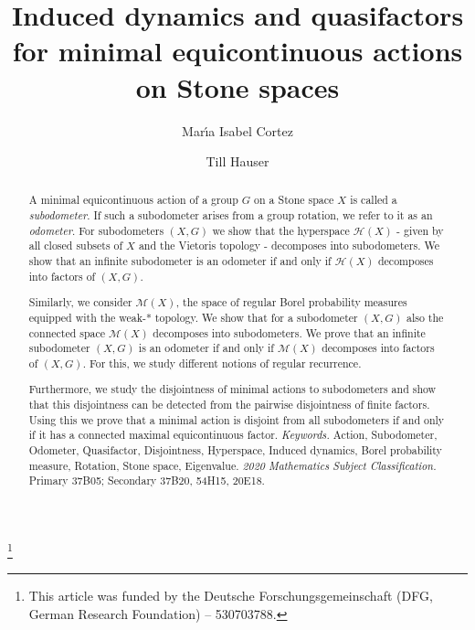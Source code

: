\documentclass[12pt, reqno]{amsart}
\theoremstyle{definition}
\theoremstyle{remark}
\numberwithin{equation}{section}
\theoremstyle{theorem}
\theoremstyle{remark}
\def\hyper{{\mathcal{H}}}
\begin{document}
\color{black}

\title
[Induced dynamics and quasifactors for subodometers]
{Induced dynamics and quasifactors for minimal equicontinuous actions on Stone spaces}

\author[]{Mar\'{\i}a Isabel Cortez}
\address{Facultad de Matem\'aticas, Pontificia Universidad Cat\'olica de Chile. Edificio Rolando Chuaqui, Campus San Joaquín. Avda. Vicuña Mackenna 4860, Macul, Chile.}

\author[]{Till Hauser}
\address{Facultad de Matem\'aticas, Pontificia Universidad Cat\'olica de Chile. Edificio Rolando Chuaqui, Campus San Joaquín. Avda. Vicuña Mackenna 4860, Macul, Chile.}

\thanks{This article was funded by the Deutsche Forschungsgemeinschaft (DFG, German Research Foundation) – 530703788.}

\begin{abstract}
    A minimal equicontinuous action of a group $G$ on a Stone space $X$ is called a \emph{subodometer}. 
    If such a subodometer arises from a group rotation, we refer to it as an \emph{odometer}.
    For subodometers $(X,G)$ we show that the hyperspace $\hyper(X)$ - given by all closed subsets of $X$ and the Vietoris topology - decomposes into subodometers.     
    We show that an infinite subodometer is an odometer if and only if $\hyper(X)$ decomposes into factors of $(X,G)$. 
    
    Similarly, we consider $\mathcal{M}(X)$, the space of regular Borel probability measures equipped with the weak-* topology. 
    We show that for a subodometer $(X,G)$ also the connected space $\mathcal{M}(X)$ decomposes into subodometers.
    We prove that an infinite subodometer $(X,G)$ is an odometer if and only if $\mathcal{M}(X)$ decomposes into factors of $(X,G)$. 
    For this, we study different notions of regular recurrence. 
    
    Furthermore, we study the disjointness of minimal actions to subodometers and show that this disjointness can be detected from the pairwise disjointness of finite factors.     
    Using this we prove that a minimal action is disjoint from all subodometers if and only if it has a connected maximal equicontinuous factor. 
\newline
\newline
\noindent \textit{Keywords.} 
Action,
Subodometer, 
Odometer, 
Quasifactor,
Disjointness, 
Hyperspace, 
Induced dynamics, 
Borel probability measure, 
Rotation, 
Stone space,
Eigenvalue. 
\newline
\noindent \textit{2020 Mathematics Subject Classification.} 
Primary {37B05}; Secondary {37B20}, {54H15}, {20E18}. 
\end{abstract} \maketitle
\end{document}
